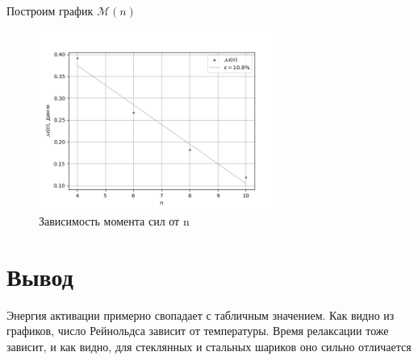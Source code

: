 \documentclass[12pt,a4paper]{article}
\begin{document}
\begin{enumerate}
  Построим график $\mathcal{M}(n)$
  \begin{figure}[H]
    \includegraphics*[width=0.7\textwidth]{m(n).png}
    \caption{Зависимость момента сил от n}
  \end{figure}

\end{enumerate}

\section*{Вывод}
Энергия активации примерно свопадает с табличным значением.
Как видно из графиков, число Рейнольдса зависит от температуры.
Время релаксации тоже зависит, и как видно, для стеклянных и стальных шариков оно сильно отличается
\end{document}
